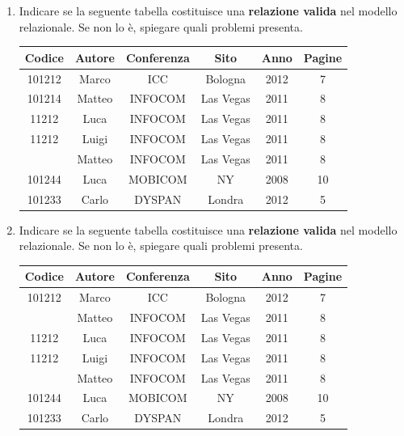 \documentclass[a4paper,12pt]{article}
\begin{document}
\begin{enumerate}
\item 

Indicare se la seguente tabella costituisce una \textbf{relazione valida} nel modello relazionale.  
Se non lo è, spiegare quali problemi presenta.

\begin{center}
\begin{tabular}{|c|c|c|c|c|c|}
\hline
\textbf{Codice} & \textbf{Autore} & \textbf{Conferenza} & \textbf{Sito} & \textbf{Anno} & \textbf{Pagine} \\
\hline
101212 & Marco & ICC & Bologna & 2012 & 7 \\
101214 & Matteo & INFOCOM & Las Vegas & 2011 & 8 \\
11212 & Luca & INFOCOM & Las Vegas & 2011 & 8 \\
11212 & Luigi & INFOCOM & Las Vegas & 2011 & 8 \\
 & Matteo & INFOCOM & Las Vegas & 2011 & 8 \\
101244 & Luca & MOBICOM & NY & 2008 & 10 \\
101233 & Carlo & DYSPAN & Londra & 2012 & 5 \\
\hline
\end{tabular}
\end{center}


\item 

Indicare se la seguente tabella costituisce una \textbf{relazione valida} nel modello relazionale.  
Se non lo è, spiegare quali problemi presenta.

\begin{center}
\begin{tabular}{|c|c|c|c|c|c|}
\hline
\textbf{Codice} & \textbf{Autore} & \textbf{Conferenza} & \textbf{Sito} & \textbf{Anno} & \textbf{Pagine} \\
\hline
101212 & Marco & ICC & Bologna & 2012 & 7 \\
 & Matteo & INFOCOM & Las Vegas & 2011 & 8 \\
11212 & Luca & INFOCOM & Las Vegas & 2011 & 8 \\
11212 & Luigi & INFOCOM & Las Vegas & 2011 & 8 \\
 & Matteo & INFOCOM & Las Vegas & 2011 & 8 \\
101244 & Luca & MOBICOM & NY & 2008 & 10 \\
101233 & Carlo & DYSPAN & Londra & 2012 & 5 \\
\hline
\end{tabular}
\end{center}



\end{enumerate}
\end{document}
